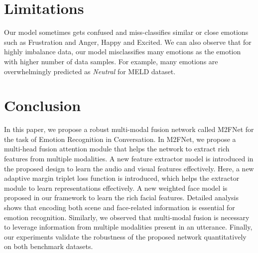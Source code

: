 \documentclass[10pt,twocolumn,letterpaper]{article}
\begin{document}
\section{Limitations}
Our model sometimes gets confused and miss-classifies similar or close emotions such as Frustration and Anger, Happy and Excited. We can also observe that for highly imbalance data, our model misclassifies many emotions as the emotion with higher number of data samples. For example, many emotions are overwhelmingly predicted as \textit{Neutral} for MELD dataset.


\section{Conclusion}
In this paper, we propose a robust multi-modal fusion network called M2FNet for the task of Emotion Recognition in Conversation. In M2FNet, we propose a multi-head fusion attention module that helps the network to extract rich features from multiple modalities. A new feature extractor model is introduced in the proposed design to learn the audio and visual features effectively. Here, a new adaptive margin triplet loss function is introduced, which helps the extractor module to learn representations effectively. A new weighted face model is proposed in our framework to learn the rich facial features. Detailed analysis shows that encoding both scene and face-related information is essential for emotion recognition. Similarly, we observed that multi-modal fusion is necessary to leverage information from multiple modalities present in an utterance. Finally, our experiments validate the robustness of the proposed network quantitatively on both benchmark datasets. 

\newpage
\balance
{\small


}
\end{document}
